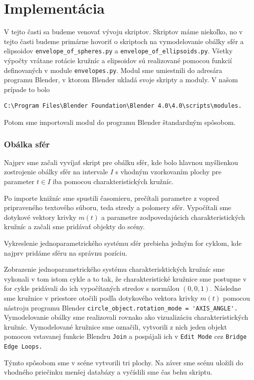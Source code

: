 \section{Implementácia}
V tejto časti sa budeme venovať vývoju skriptov. Skriptov máme niekoľko, no v tejto časti budeme primárne hovoriť o skriptoch na vymodelovanie obálky sfér a elipsoidov \verb|envelope_of_spheres.py| a \verb|envelope_of_ellipsoids.py|. Všetky výpočty vrátane rotácie kružníc a elipsoidov sú realizované pomocou funkcií definovaných v module \verb|envelopes.py|. Modul sme umiestnili do adresára programu Blender, v ktorom Blender ukladá svoje skripty a moduly. V našom prípade to bolo \begin{verbatim}
C:\Program Files\Blender Foundation\Blender 4.0\4.0\scripts\modules.
\end{verbatim} Potom sme importovali modul do programu Blender štandardným spôsobom. 
\subsubsection*{Obálka sfér}
Najprv sme začali vyvíjať skript pre obálku sfér, kde bolo hlavnou myšlienkou zostrojenie obálky sfér na intervale $I$ s vhodným vzorkovaním plochy pre parameter $t \in I$ iba pomocou charakteristických kružníc. 

Po importe knižníc sme spustili časomieru, prečítali parametre z vopred pripraveného textového súboru, teda stredy a polomery sfér. Vypočítali sme dotykové vektory krivky $m(t)$ a parametre zodpovedajúcich charakteristických kružníc a začali sme pridávať objekty do scény. 

Vykreslenie jednoparametrického systému sfér prebieha jedným for cyklom, kde najprv pridáme sféru na správnu pozíciu.

Zobrazenie jednoparametrického systému charakterisktických kružníc sme vykonali v tom istom cykle a to tak, že charakteristické kružnice sme postupne v for cykle pridávali do ich vypočítaných stredov s normálou $(0,0,1). $ Následne sme kružnice v priestore otočili podľa dotykového vektora krivky $m(t)$ pomocou nástroju programu Blender \verb|circle_object.rotation_mode = 'AXIS_ANGLE'.|
Vymodelovanie obálky sme realizovali rovnako ako vizualizáciu charakteristických kružníc. Vymodelované kružnice sme označili, vytvorili z nich jeden objekt pomocou vstavanej funkcie Blendru \verb|Join| a pospájali ich v \verb|Edit Mode| cez \verb|Bridge Edge Loops.| 

Týmto spôsobom sme v scéne vytvorili tri plochy. Na záver sme scénu uložili do vhodného priečinku menšej databázy a vyčíslili sme čas behu skriptu.
